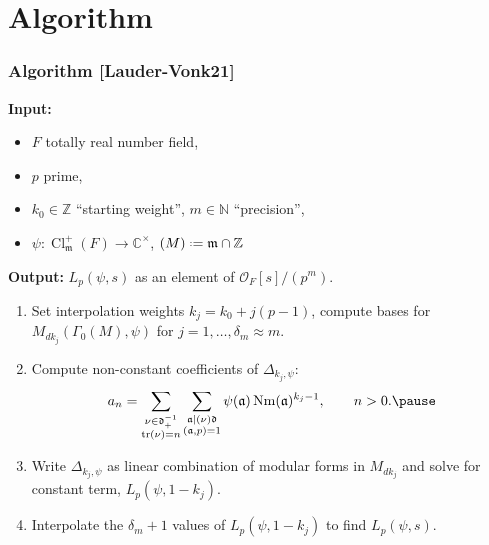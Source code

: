 \documentclass[10pt]{beamer}
\let\mf\mathfrak
\newcommand{\N}{\mathbb{N}}
\newcommand{\Z}{\mathbb{Z}}
\newcommand{\C}{\mathbb{C}}
\renewcommand{\O}{\mathcal{O}}
\newcommand*{\defeq}{\mathrel{\vcenter{\baselineskip0.5ex \lineskiplimit0pt
      \hbox{\scriptsize.}\hbox{\scriptsize.}}}%
  =}
\DeclareMathOperator{\Nm}{Nm}
\DeclareMathOperator{\Cl}{Cl}
\begin{document}
\section{Algorithm}
\begin{frame}
  \frametitle{Algorithm [Lauder-Vonk21]}\pause
  \textbf{Input:}\pause
  \begin{itemize}[itemsep=0pt,leftmargin=0pt]
  \item $F$ totally real number field,\pause
  \item $p$ prime,\pause
  \item $k_0 \in \Z $ ``starting weight'', $m \in \N$ ``precision'',\pause
  \item  $\psi \colon \Cl_{\mf m}^{+}(F)\to \C^{\times}$, $(M) \defeq \mf m \cap \Z$ \pause
  \end{itemize}

 \textbf{Output:} $L_p(\psi,s)$ as an element of $\O_{F}[s]/(p^m)$. \pause

 \begin{enumerate}[leftmargin=2pt]
 \item Set interpolation weights $k_{j} = k_{0} + j(p-1)$, \pause  compute
   bases for $M_{dk_{j}}(\Gamma_{0}(M),\psi)$ for $j =1, \ldots ,\delta_{m} \approx m$.\pause
 \item Compute non-constant coefficients of $\Delta_{k_{j},\psi}$:
   \[ a_{n} =\sum_{\substack{ \nu \in \mf
      d^{-1}_{+}\\ \tr(\nu) = n}}\sum_{\substack{\mf a \mid (\nu)\mf d \\ (\mf a, p) =
        1}}\psi(\mf a)\Nm(\mf a)^{k_{j}-1}, \qq{} n>0. \pause
   \]
 \item Write $\Delta_{k_{j},\psi}$ as linear combination of modular forms in
   $M_{dk_{j}}$ and solve for constant term, $L_{p}(\psi,1-k_{j})$. \pause
 \item Interpolate the $\delta_{m}+1$ values of $L_{p}(\psi,1-k_{j})$ to find
   $L_{p}(\psi,s)$.
 \end{enumerate}

\end{frame}
\end{document}
